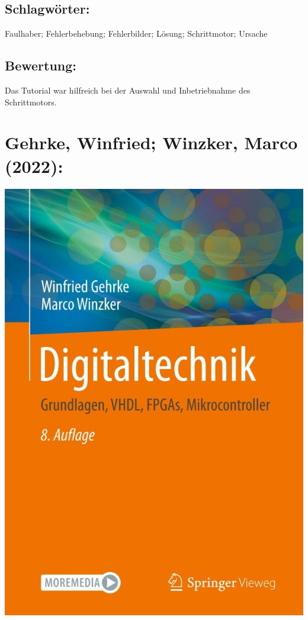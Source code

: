 \subsection*{Schlagwörter:}
Faulhaber; Fehlerbehebung; Fehlerbilder; Lösung; Schrittmotor; Ursache
\subsection*{Bewertung:}
Das Tutorial war hilfreich bei der Auswahl und Inbetriebnahme des  Schrittmotors.

\section*{Gehrke, Winfried; Winzker, Marco (2022):}
\begin{minipage}{0.5\textwidth}
	\includegraphics[width=\linewidth]{../Appendix/Literaturverzeichnis/img/Gehrke.jpg}
\end{minipage}

